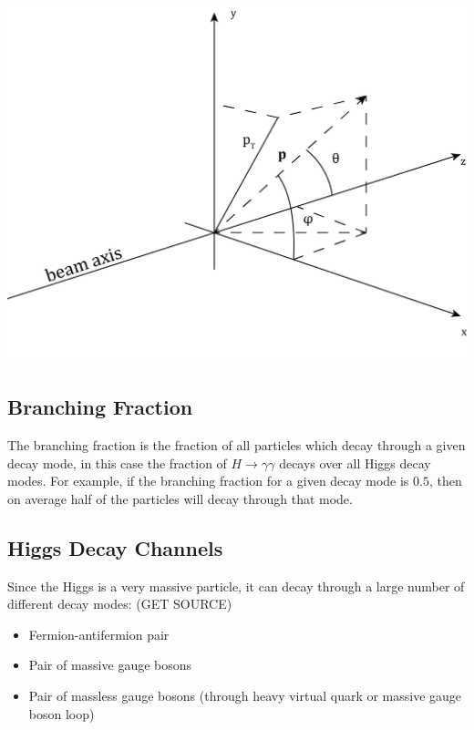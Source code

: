 \documentclass[11pt]{amsart}
\newenvironment{Figure}
  {\par\medskip\noindent\minipage{\linewidth}}
  {\endminipage\par\medskip}
\begin{document}
\begin{multicols}{2}
\begin{Figure}
  \centering
  \includegraphics[width=\linewidth]{kinematics}
  \label{fig:kinematics}
\end{Figure}

\subsection{Branching Fraction}
\label{sec:branching}

The branching fraction is the fraction of all particles which decay through a given decay mode, in this case the fraction of $H \to \gamma\gamma$ decays over all Higgs decay modes. For example, if the branching fraction for a given decay mode is $0.5$, then on average half of the particles will decay through that mode.

\subsection{Higgs Decay Channels}

Since the Higgs is a very massive particle, it can decay through a large number of different decay modes: (GET SOURCE)

\begin{itemize}
    \item Fermion-antifermion pair
    \item Pair of massive gauge bosons
    \item Pair of massless gauge bosons (through heavy virtual quark or massive gauge boson loop)
\end{itemize}


\end{multicols}
\end{document}
